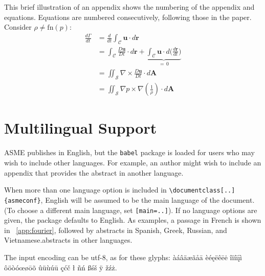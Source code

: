 \documentclass[balance,upint,subscriptcorrection,varvw,mathalfa=cal=boondoxo,spanish,french,vietnamese,russian,greek,pdf-a,colorlinks]{asmeconf}
\begin{document}
This brief illustration of an appendix shows the numbering of the appendix and equations. Equations are numbered
consecutively, following those in the paper. Consider $\rho \neq \textrm{fn}(p)$:
\begin{align}
\frac{d\Gamma}{dt} &{}= \frac{d}{dt} \int_{\mathcal{C}} \mathbf{u} \cdot d\mathbf{r}\\
				   &{}= \int_{\mathcal{C}} \frac{D\mathbf{u}}{Dt} \cdot d\mathbf{r} + \underbrace{\int_{\mathcal{C}} \mathbf{u}\cdot d\biggl( \frac{d\mathbf{r}}{dt}\Biggr)}_{=\, 0} \\[-2pt]
                   &{}= \iint_{\mathcal{S}} \nabla \times \frac{D\mathbf{u}}{Dt}  \cdot d\mathbf{A}\\
                   &{}= \iint_{\mathcal{S}}  \nabla p \times \nabla \left( \frac{1}{\rho}\right) \cdot d\mathbf{A}
\end{align}

\section{Multilingual Support}\label{appendix:b}

ASME publishes in English, but the \texttt{babel} package is loaded for 
users who may wish to include other languages. For example, an author might wish to include an appendix that provides the 
abstract in another language.

When more than one language option is included in \verb|\documentclass[..]{asmeconf}|, English will be 
assumed to be the main language of the document. (To choose a different main language, set \texttt{[main=..]}).
If no language options are given, the package defaults to English.  As examples, a passage in French is 
shown in \appendixname~\ref{app:fourier}, followed by 
\ifpdftex abstracts in Spanish, Greek, Russian, and Vietnamese.\else abstracts in other languages.\fi

The input encoding can be utf-8, as for these glyphs:
%
àáâäæãåā  èéęëêēė  îïíīįì ôöòóœøōõ ûüùúū çćč ł ñń ßśš ÿ žźż.
\end{document}
